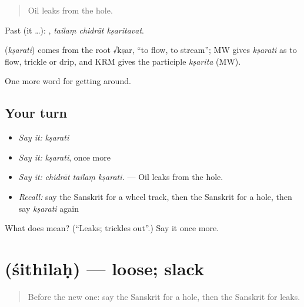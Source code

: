 \begin{quote}
Oil leaks from the hole.
\end{quote}

Past (it …):   , \emph{tailaṃ chidrāt kṣaritavat}.

\begin{cousinweb}
\textbf{} (\emph{kṣarati}) comes from the root √kṣar, \textquotedblleft{}to flow, to stream\textquotedblright{}; MW gives \emph{kṣarati} as to flow, trickle or drip, and KRM gives the participle \emph{kṣarita} (MW).
\end{cousinweb}

\begin{grammarlens}[title={What you've built}]
One more word for getting around.
\end{grammarlens}

\subsection*{Your turn}
\begin{itemize}
\raggedright
  \item \emph{Say it:} \emph{kṣarati}
  \item \emph{Say it:} \emph{kṣarati}, once more
  \item \emph{Say it:} \emph{chidrāt tailaṃ kṣarati.} — Oil leaks from the hole.
  \item \emph{Recall:} say the Sanskrit for a wheel track, then the Sanskrit for a hole, then say \emph{kṣarati} again
\end{itemize}

\begin{tcolorbox}[breakable,colback=teal!4,colframe=teal!35!black,title={Before you move on}]
What does  mean? (\textquotedblleft{}Leaks; trickles out\textquotedblright{}.) Say it once more.
\end{tcolorbox}
\section[\texorpdfstring{\sk{शिथिलः} (śithilaḥ)}{शिथिलः (śithilaḥ)}]{ (śithilaḥ) — loose; slack}

\label{lesson:SA-C410-sithilah}



\begin{quote}
Before the new one: say the Sanskrit for a hole, then the Sanskrit for leaks.
\end{quote}

